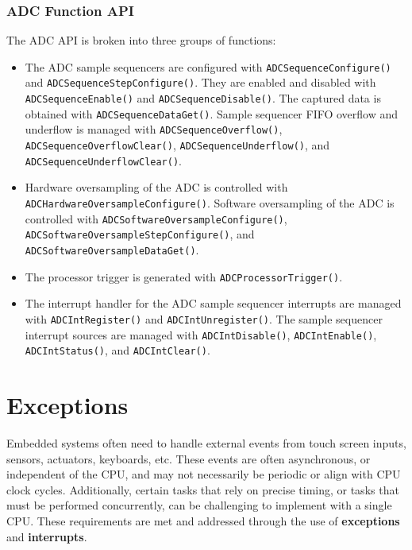 \documentclass{article}
\begin{document}
\subsubsection{ADC Function API}
The ADC API is broken into three groups of functions:
\begin{itemize}
    \item The ADC sample sequencers are configured with
          \texttt{ADCSequenceConfigure()} and
          \texttt{ADCSequenceStepConfigure()}. They are enabled
          and disabled with \texttt{ADCSequenceEnable()} and
          \texttt{ADCSequenceDisable()}. The captured data is
          obtained with \texttt{ADCSequenceDataGet()}. Sample
          sequencer FIFO overflow and underflow is managed with
          \texttt{ADCSequenceOverflow()},
          \texttt{ADCSequenceOverflowClear()},
          \texttt{ADCSequenceUnderflow()}, and
          \texttt{ADCSequenceUnderflowClear()}.
    \item Hardware oversampling of the ADC is controlled with
          \texttt{ADCHardwareOversampleConfigure()}. Software
          oversampling of the ADC is controlled with
          \texttt{ADCSoftwareOversampleConfigure()},
          \texttt{ADCSoftwareOversampleStepConfigure()}, and
          \texttt{ADCSoftwareOversampleDataGet()}.
    \item The processor trigger is generated with
          \texttt{ADCProcessorTrigger()}.
    \item The interrupt handler for the ADC sample sequencer interrupts
          are managed with \texttt{ADCIntRegister()} and
          \texttt{ADCIntUnregister()}. The sample sequencer
          interrupt sources are managed with
          \texttt{ADCIntDisable()},
          \texttt{ADCIntEnable()},
          \texttt{ADCIntStatus()}, and
          \texttt{ADCIntClear()}.
\end{itemize}
\section{Exceptions}
Embedded systems often need to handle external events from touch screen
inputs, sensors, actuators, keyboards, etc. These events are often
asynchronous, or independent of the CPU, and may not necessarily be
periodic or align with CPU clock cycles. Additionally, certain tasks
that rely on precise timing, or tasks that must be performed
concurrently, can be challenging to implement with a single CPU. These
requirements are met and addressed through the use of
\textbf{exceptions} and \textbf{interrupts}.
\end{document}
